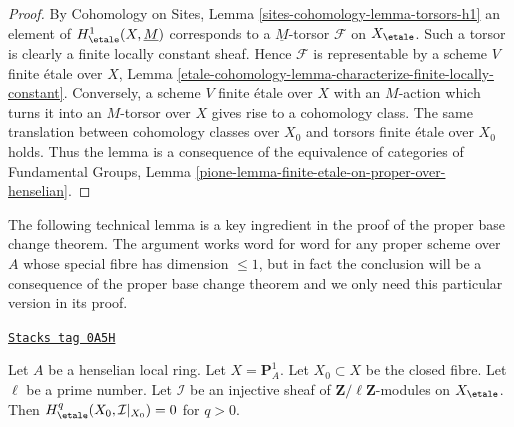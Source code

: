 \begin{proof}
By Cohomology on Sites, Lemma \ref{sites-cohomology-lemma-torsors-h1}
an element of $H^1_\etale(X, \underline{M})$ corresponds to a
$\underline{M}$-torsor $\mathcal{F}$ on $X_\etale$.
Such a torsor is clearly a finite locally constant sheaf.
Hence $\mathcal{F}$ is representable by a scheme $V$ finite
\'etale over $X$, Lemma \ref{etale-cohomology-lemma-characterize-finite-locally-constant}.
Conversely, a scheme $V$ finite \'etale over $X$ with an $M$-action
which turns it into an $M$-torsor over $X$ gives rise to a cohomology
class. The same translation between cohomology classes over $X_0$ and
torsors finite \'etale over $X_0$ holds. Thus the lemma
is a consequence of the equivalence of categories of
Fundamental Groups, Lemma
\ref{pione-lemma-finite-etale-on-proper-over-henselian}.
\end{proof}

The following technical lemma is a key ingredient in the proof of
the proper base change theorem. The argument works word for word
for any proper scheme over $A$ whose special fibre has dimension
$\leq 1$, but in fact the conclusion will be a consequence of the
proper base change theorem and we only need this particular version
in its proof.

\begin{lemma}
\label{etale-cohomology-lemma-efface-cohomology-on-fibre-by-finite-cover}
\href{https://stacks.math.columbia.edu/tag/0A5H}{\texttt{Stacks tag 0A5H}}

Let $A$ be a henselian local ring. Let $X = \mathbf{P}^1_A$.
Let $X_0 \subset X$ be the closed fibre. Let $\ell$ be a prime
number. Let $\mathcal{I}$ be an injective sheaf of
$\mathbf{Z}/\ell\mathbf{Z}$-modules on $X_\etale$. Then
$H^q_\etale(X_0, \mathcal{I}|_{X_0}) = 0$ for $q > 0$.
\end{lemma}

